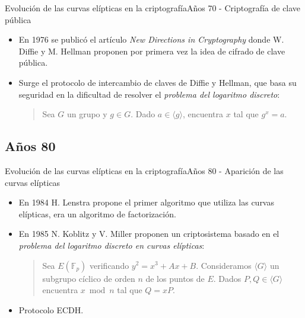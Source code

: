 \documentclass[spanish]{beamer}
\begin{document}
\begin{frame}[fragile]{Evolución de las curvas elípticas en la criptografía}{Años 70 - Criptografía de clave pública}
  \begin{itemize}
  \item En 1976 se publicó el artículo \textit{New Directions in Cryptography} donde W. Diffie y M. Hellman proponen por primera vez la idea de cifrado de clave pública. %
  \item Surge el protocolo de intercambio de claves de Diffie y Hellman, que basa su seguridad en la dificultad de resolver el \textit{problema del logaritmo discreto}:

  \begin{quote}
    \vspace{1em}
    Sea \(G\) un grupo y $g \in G$. Dado \(a \in \langle g \rangle\), encuentra \(x\) tal que \(g^x = a\). %
\end{quote}
  \end{itemize}
\end{frame}

\subsection{Años 80}
\begin{frame}[fragile]{Evolución de las curvas elípticas en la criptografía}{Años 80 - Aparición de las curvas elípticas}
  \begin{itemize}
    \item En 1984 H. Lenstra propone el primer algoritmo que utiliza las curvas elípticas, era un algoritmo de factorización.
    \item En 1985 N. Koblitz y V. Miller proponen un criptosistema basado en el \textit{problema del logaritmo discreto en curvas elípticas}:

    \begin{quote}
      \vspace{.5em}
      Sea $E(\mathbb{F}_p)$ verificando $y^2 =x^3 + Ax + B$. Consideramos $\langle G \rangle$ un subgrupo cíclico de orden $n$ de los puntos de $E$. Dados $P,Q \in \langle G \rangle$ encuentra $x \bmod{n}$ tal que $Q=xP$.
      \vspace{.5em}
      \end{quote}
    \item Protocolo ECDH.
  \end{itemize}
\end{frame}
\end{document}
